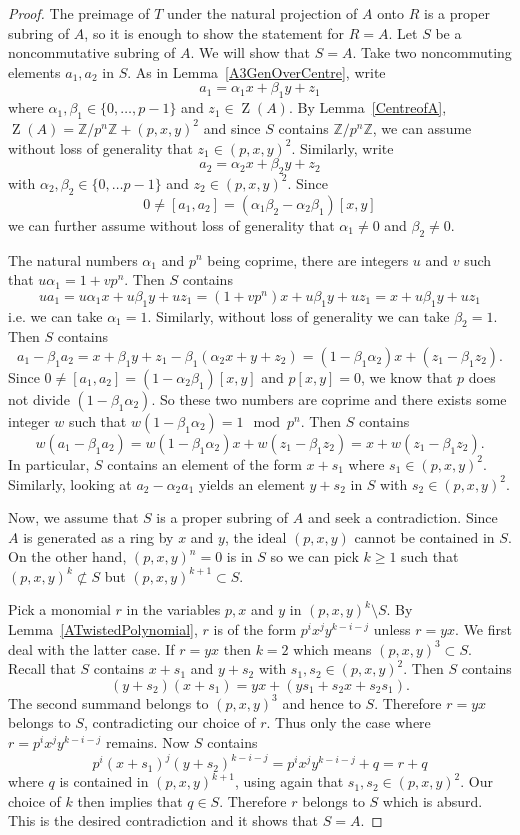\documentclass[11pt]{article}
\DeclareMathOperator{\Z}{Z}
\theoremstyle{definition}
\begin{document}
\begin{proof}
The preimage of $T$ under the natural projection of $A$ onto $R$ is a proper subring of $A$, so it is enough to show the statement for $R=A$. Let $S$ be a noncommutative subring of $A$. We will show that $S=A$. Take two noncommuting elements $a_1,a_2$ in $S$. As in Lemma~\ref{A3GenOverCentre}, write
\[a_1=\alpha_1 x +\beta_1 y+z_1\]
where $\alpha_1,\beta_1\in\lbrace0,\ldots,p-1\rbrace$ and $z_1\in\Z(A)$. By Lemma~\ref{CentreofA}, $\Z(A)=\mathbb{Z}/p^n\mathbb{Z}+(p,x,y)^2$ and since $S$ contains $\mathbb{Z}/p^n\mathbb{Z}$, we can assume without loss of generality that $z_1\in(p,x,y)^2$. Similarly, write
\[a_2=\alpha_2x+\beta_2y+z_2\]
with $\alpha_2,\beta_2\in\lbrace0,\ldots p-1\rbrace$ and $z_2\in (p,x,y)^2$. Since
\[0\neq [a_1,a_2]=(\alpha_1\beta_2-\alpha_2\beta_1)[x,y]\]
we can further assume without loss of generality that $\alpha_1\neq 0$ and $\beta_2\neq 0$.

The natural numbers $\alpha_1$ and $p^n$ being coprime, there are integers $u$ and $v$ such that $u\alpha_1=1+vp^n$. Then $S$ contains
\[ua_1=u\alpha_1 x+u\beta_1y+uz_1=(1+vp^n)x+u\beta_1y+uz_1=x+u\beta_1y+uz_1\]
i.e. we can take $\alpha_1=1$. Similarly, without loss of generality we can take $\beta_2=1$. Then $S$ contains
\[a_1-\beta_1a_2=x+\beta_1y+z_1-\beta_1(\alpha_2x+y+z_2)=(1-\beta_1\alpha_2)x+(z_1-\beta_1z_2).\]
Since $0\neq [a_1,a_2]=(1-\alpha_2\beta_1)[x,y]$ and $p[x,y]=0$, we know that $p$ does not divide $(1-\beta_1\alpha_2)$. So these two numbers are coprime and there exists some integer $w$ such that $w(1-\beta_1\alpha_2)=1 \mod p^n$. Then $S$ contains
\[w(a_1-\beta_1a_2)=w(1-\beta_1\alpha_2)x+w(z_1-\beta_1z_2)=x+w(z_1-\beta_1z_2).\]
In particular, $S$ contains an element of the form $x+s_1$ where $s_1\in (p,x,y)^2$. Similarly, looking at $a_2-\alpha_2a_1$ yields an element $y+s_2$ in $S$ with $s_2\in(p,x,y)^2$.

Now, we assume that $S$ is a proper subring of $A$ and seek a contradiction. Since $A$ is generated as a ring by $x$ and $y$, the ideal $(p,x,y)$ cannot be contained in $S$. On the other hand, $(p,x,y)^n=0$ is in $S$ so we can pick $k\geq 1$ such that $(p,x,y)^k\not\subset S$ but $(p,x,y)^{k+1}\subset S$.

Pick a monomial $r$ in the variables $p,x$ and $y$ in $(p,x,y)^k\setminus S$. By Lemma~\ref{ATwistedPolynomial}, $r$ is of the form $p^ix^jy^{k-i-j}$ unless $r=yx$. We first deal with the latter case. If $r=yx$ then $k=2$ which means $(p,x,y)^3\subset S$. Recall that $S$ contains $x+s_1$ and $y+s_2$ with $s_1,s_2\in(p,x,y)^2$. Then $S$ contains
\[(y+s_2)(x+s_1)=yx+(ys_1+s_2x+s_2s_1).\]
The second summand belongs to $(p,x,y)^3$ and hence to $S$. Therefore $r=yx$ belongs to $S$, contradicting our choice of $r$. Thus only the case where $r=p^ix^jy^{k-i-j}$ remains. Now $S$ contains
\[p^i(x+s_1)^j(y+s_2)^{k-i-j}=p^ix^jy^{k-i-j}+q=r+q\]
where $q$ is contained in $(p,x,y)^{k+1}$, using again that $s_1,s_2\in(p,x,y)^2$. Our choice of $k$ then implies that $q\in S$. Therefore $r$ belongs to $S$ which is absurd. This is the desired contradiction and it shows that $S=A$.
\end{proof}
\end{document}
